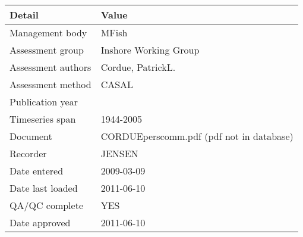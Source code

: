 \begin{table}[htb]
\centering
\begin{tabular}{ll}
\toprule
Detail & Value \\
\midrule
Management body    & MFish                                    \\
Assessment group   & Inshore Working Group                    \\
Assessment authors & Cordue, PatrickL.                        \\
Assessment method  & CASAL                                    \\
Publication year   &                                          \\
Timeseries span    & 1944-2005                                \\
Document           & CORDUEperscomm.pdf (pdf not in database) \\
Recorder           & JENSEN                                   \\
Date entered       & 2009-03-09                               \\
Date last loaded   & 2011-06-10                               \\
QA/QC complete     & YES                                      \\
Date approved      & 2011-06-10                               \\
\bottomrule
\end{tabular}
\label{tab:assessdet}
\end{table}
